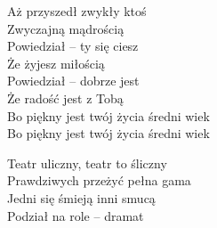 \begin{text}
    Aż przyszedł zwykły ktoś\\
    Zwyczajną mądrością\\
    Powiedział – ty się ciesz\\
    Że żyjesz miłością\\
    Powiedział – dobrze jest\\
    Że radość jest z Tobą\\
    Bo piękny jest twój życia średni wiek\\
    Bo piękny jest twój życia średni wiek

    Teatr uliczny, teatr to śliczny\\
    Prawdziwych przeżyć pełna gama\\
    Jedni się śmieją inni smucą\\
    Podział na role – dramat
\end{text}
\begin{chord}

\end{chord}